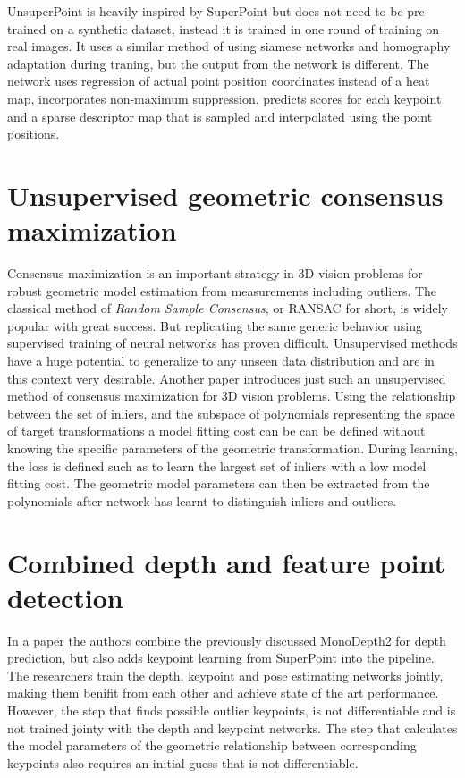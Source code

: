 UnsuperPoint\cite{unsuperpoint} is heavily inspired by SuperPoint but does not need to be pre-trained on a synthetic dataset, instead it is trained in one round of training on real images. It uses a similar method of using siamese networks and homography adaptation during traning, but the output from the network is different. The network uses regression of actual point position coordinates instead of a heat map, incorporates non-maximum suppression, predicts scores for each keypoint and a sparse descriptor map that is sampled and interpolated using the point positions.

\section{Unsupervised geometric consensus maximization}

Consensus maximization is an important strategy in 3D vision problems for robust geometric model estimation from measurements including outliers. The classical method of \textit{Random Sample Consensus}, or RANSAC\cite{ransac} for short, is widely popular with great success. But replicating the same generic behavior using supervised training of neural networks has proven difficult. Unsupervised methods have a huge potential to generalize to any unseen data distribution and are in this context very desirable. Another paper\cite{consensus} introduces just such an unsupervised method of consensus maximization for 3D vision problems. Using the relationship between the set of inliers, and the subspace of polynomials representing the space of target transformations a model fitting cost can be can be defined without knowing the specific parameters of the geometric transformation. During learning, the loss is defined such as to learn the largest set of inliers with a low model fitting cost. The geometric model parameters can then be extracted from the polynomials after network has learnt to distinguish inliers and outliers.

\section{Combined depth and feature point detection}

In a paper\cite{keypointdepth} the authors combine the previously discussed MonoDepth2\cite{monodepth2} for depth prediction, but also adds keypoint learning from SuperPoint\cite{superpoint} into the pipeline. The researchers train the depth, keypoint and pose estimating networks jointly, making them benifit from each other and achieve state of the art performance.  However, the step that finds possible outlier keypoints, is not differentiable and is not trained jointy with the depth and keypoint networks. The step that calculates the model parameters of the geometric relationship between corresponding keypoints also requires an initial guess that is not differentiable.

